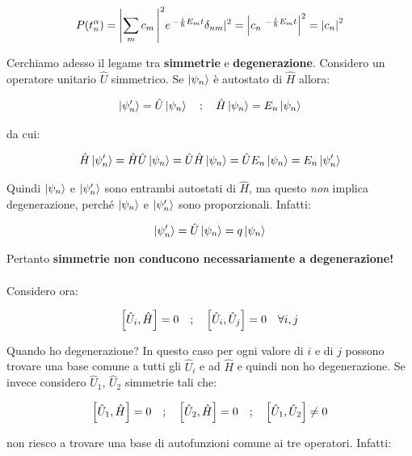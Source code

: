 \begin{align*}
	P\qty(t_n^{\alpha}) = \qty|\sum_m c_m \, |^2 e^{\, - \frac{i}{\hbar} E_m t} \delta_{nm}|^2 = \qty|c_n \, ^{\, - \frac{i}{\hbar} E_m t} |^2 = \qty|c_n|^2
\end{align*}

	Cerchiamo adesso il legame tra \textbf{simmetrie} e \textbf{degenerazione}. Considero un operatore unitario $\hat{U}$ simmetrico. Se $\ket{\psi_n}$ è autostato di $\hat{H}$ allora:
	
\begin{align*}
	\ket{\psi_n'} = \hat{U} \ket{\psi_n} \quad ; \quad \hat{H} \ket{\psi_n} = E_n \ket{\psi_n}
\end{align*}

	da cui:
	
\begin{align*}
	\hat{H} \ket{\psi'_n} = \hat{H} \hat{U} \ket{\psi_n} = \hat{U} \hat{H} \ket{\psi_n} = \hat{U} E_n \ket{\psi_n} = E_n \ket{\psi_n'}
\end{align*}

	Quindi $\ket{\psi_n}$ e $\ket{\psi_n'}$ sono entrambi autostati di $\hat{H}$, ma questo \textit{non} implica degenerazione, perché $\ket{\psi_n}$ e $\ket{\psi_n'}$ sono proporzionali. Infatti:
	
\begin{align*}
	\ket{\psi_n'} = \hat{U} \ket{\psi_n} = q \ket{\psi_n}
\end{align*}
 
	Pertanto \textbf{simmetrie non conducono necessariamente a degenerazione!}
	\\
	\\
	Considero ora:
	
\begin{align*}
	\qty[\hat{U}_i, \hat{H}] = 0 \quad ; \quad \qty[\hat{U}_i, \hat{U}_j] = 0 \quad \forall i, j
\end{align*}

	Quando ho degenerazione? In questo caso per ogni valore di $i$ e di $j$ possono trovare una base comune a tutti gli $\hat{U}_i$ e ad $\hat{H}$ e quindi non ho degenerazione. Se invece considero $\hat{U}_1$, $\hat{U}_2$ simmetrie tali che:
	
\begin{align*}
	\qty[\hat{U}_1, \hat{H}] = 0 \quad ; \quad \qty[\hat{U}_2, \hat{H}] = 0 \quad ; \quad \qty[\hat{U}_1, \hat{U}_2] \neq 0
\end{align*}

	non riesco a trovare una base di autofunzioni comune ai tre operatori. Infatti:
	

